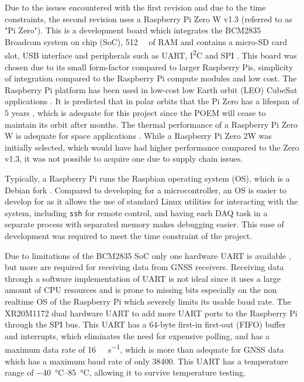 \documentclass[a4paper,11pt]{article}
\begin{document}
Due to the issues encountered with the first revision and due to the time constraints, the second revision uses a Raspberry Pi Zero W v1.3 (referred to as "Pi Zero"). This is a development board which integrates the BCM2835 Broadcom system on chip (SoC), \SI{512}{\mega\byte} of RAM and contains a micro-SD card slot, USB interface and peripherals such as UART, I\textsuperscript{2}C and SPI \cite{upton2016raspberry}. This board was chosen due to its small form-factor compared to larger Raspberry Pis, simplicity of integration compared to the Raspberry Pi compute modules and low cost. The Raspberry Pi platform has been used in low-cost low Earth orbit (LEO) CubeSat applications \cite{guertin2022raspberry}. It is predicted that in polar orbits that the Pi Zero has a lifespan of 5 years \cite{guertin2022raspberry}, which is adequate for this project since the POEM will cease to maintain its orbit after  months. The thermal performance of a Raspberry Pi Zero W is adequate for space applications \cite{guertin2022raspberry}. While a Raspberry Pi Zero 2W was initially selected, which would have had higher performance compared to the Zero v1.3, it was not possible to acquire one due to supply chain issues.

Typically, a Raspberry Pi runs the Raspbian operating system (OS), which is a Debian fork \cite{upton2016raspberry}. Compared to developing for a microcontroller, an OS is easier to develop for as it allows the use of standard Linux utilities for interacting with the system, including \texttt{ssh} for remote control, and having each DAQ task in a separate process with separated memory makes debugging easier. This ease of development was required to meet the time constraint of the project. %

Due to limitations of the BCM2835 SoC only one hardware UART is available \cite{upton2016raspberry}, but more are required for receiving data from GNSS receivers. Receiving data through a software implementation of UART is not ideal since it uses a large amount of CPU resources and is prone to missing bits especially on the non realtime OS of the Raspberry Pi which severely limits its usable baud rate. The XR20M1172 dual hardware UART to add more UART ports to the Raspberry Pi through the SPI bus. This UART has a 64-byte first-in first-out (FIFO) buffer and interrupts, which eliminates the need for expensive polling, and has a maximum data rate of \SI{16}{\mega\bit\per\second}, which is more than adequate for GNSS data \cite{maxlinear2022xr20m1172} which has a maximum baud rate of only \SI{38400}{\baud}. This UART has a temperature range of \SIrange{-40}{85}{\degreeCelsius}, allowing it to survive temperature testing.
\end{document}
